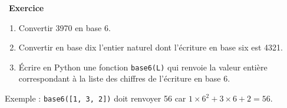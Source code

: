 \documentclass[
  11pt,
]{article}
\newcommand{\passthrough}[1]{#1}
\providecommand{\tightlist}{%
  \setlength{\itemsep}{0pt}\setlength{\parskip}{0pt}}
\newcounter{exo}
\newenvironment{exercice}[1]
{\par \medskip   \addtocounter{exo}{1} \noindent  
\begin{bclogo}[arrondi =0.1,   noborder = true, logo=\bccrayon, marge=4]{~\textbf{Exercice} \textbf{\theexo} {\itshape #1} }  \par}
{
\end{bclogo}
 \par \bigskip }
\newcounter{def}
\begin{document}
\begin{exercice}{}

\begin{enumerate}
\def\labelenumi{\arabic{enumi}.}
\tightlist
\item
  Convertir 3970 en base 6.
\item
  Convertir en base dix l'entier naturel dont l'écriture en base six est
  4321.
\item
  Écrire en Python une fonction \passthrough{\lstinline!base6(L)!} qui
  renvoie la valeur entière correspondant à la liste des chiffres de
  l'écriture en base 6.
\end{enumerate}

Exemple : \passthrough{\lstinline!base6([1, 3, 2])!} doit renvoyer 56
car \(1 \times 6^{2} + 3 \times 6 + 2 = 56\).

\end{exercice}
\end{document}
